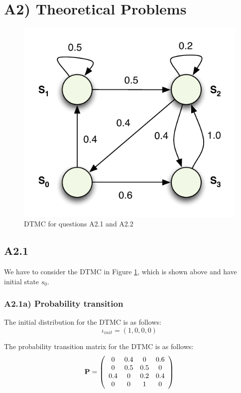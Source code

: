 \documentclass[12pt]{report}
\begin{document}
\section*{A2) Theoretical Problems}
\begin{figure}[H]
	\begin{center}
		\includegraphics[scale=.85]{../GFX/ExerciseFigure1.pdf}
	\end{center}
	\caption{DTMC for questions A2.1 and A2.2}
	\label{fig:2a12}
\end{figure}

\subsection*{A2.1}
We have to consider the DTMC in Figure \ref{fig:2a12}, which is shown above and have initial state $s_0$.

\subsubsection*{A2.1a) Probability transition}
The initial distribution for the DTMC is as follows:
$$\iota_{init} = \left(1, 0, 0, 0\right)$$

The probability transition matrix for the DTMC is as follows:
$$\mathrm{\textbf{P}} = \left(
\begin{array}{c c c c}
	0 & 0.4 & 0 & 0.6\\
	0 & 0.5 & 0.5 & 0\\
	0.4 & 0 & 0.2 & 0.4\\
	0 & 0 & 1 & 0
\end{array}
\right)$$
\end{document}
